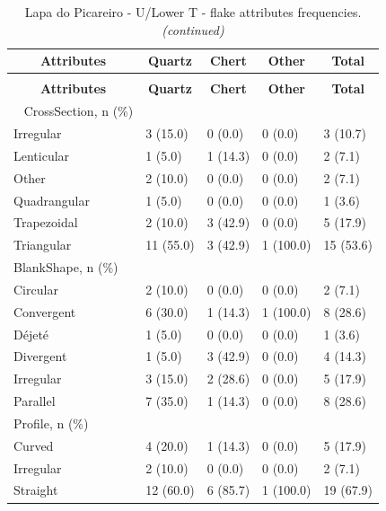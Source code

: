 \documentclass[12pt,twoside]{reedthesis}
\begin{document}
\begingroup\fontsize{9}{11}\selectfont
\begin{longtable}[t]{lllll}
\caption{\label{tab:flakeattributesLP1}Lapa do Picareiro - U/Lower T - flake attributes frequencies.}\\
\toprule
\multicolumn{1}{c}{\textbf{Attributes}} & \multicolumn{1}{c}{\textbf{Quartz}} & \multicolumn{1}{c}{\textbf{Chert}} & \multicolumn{1}{c}{\textbf{Other}} & \multicolumn{1}{c}{\textbf{Total}}\\
\midrule
\endfirsthead
\caption[]{\label{tab:flakeattributesLP1}Lapa do Picareiro - U/Lower T - flake attributes frequencies. \textit{(continued)}}\\
\toprule
\multicolumn{1}{c}{\textbf{Attributes}} & \multicolumn{1}{c}{\textbf{Quartz}} & \multicolumn{1}{c}{\textbf{Chert}} & \multicolumn{1}{c}{\textbf{Other}} & \multicolumn{1}{c}{\textbf{Total}}\\
\midrule
\endhead
\
\endfoot
\bottomrule
\endlastfoot
CrossSection, n (\%) &  &  &  & \\
Irregular & 3 (15.0) & 0 (0.0) & 0 (0.0) & 3 (10.7)\\
Lenticular & 1 (5.0) & 1 (14.3) & 0 (0.0) & 2 (7.1)\\
Other & 2 (10.0) & 0 (0.0) & 0 (0.0) & 2 (7.1)\\
Quadrangular & 1 (5.0) & 0 (0.0) & 0 (0.0) & 1 (3.6)\\
\addlinespace
Trapezoidal & 2 (10.0) & 3 (42.9) & 0 (0.0) & 5 (17.9)\\
Triangular & 11 (55.0) & 3 (42.9) & 1 (100.0) & 15 (53.6)\\
BlankShape, n (\%) &  &  &  & \\
Circular & 2 (10.0) & 0 (0.0) & 0 (0.0) & 2 (7.1)\\
Convergent & 6 (30.0) & 1 (14.3) & 1 (100.0) & 8 (28.6)\\
\addlinespace
Déjeté & 1 (5.0) & 0 (0.0) & 0 (0.0) & 1 (3.6)\\
Divergent & 1 (5.0) & 3 (42.9) & 0 (0.0) & 4 (14.3)\\
Irregular & 3 (15.0) & 2 (28.6) & 0 (0.0) & 5 (17.9)\\
Parallel & 7 (35.0) & 1 (14.3) & 0 (0.0) & 8 (28.6)\\
Profile, n (\%) &  &  &  & \\
\addlinespace
Curved & 4 (20.0) & 1 (14.3) & 0 (0.0) & 5 (17.9)\\
Irregular & 2 (10.0) & 0 (0.0) & 0 (0.0) & 2 (7.1)\\
Straight & 12 (60.0) & 6 (85.7) & 1 (100.0) & 19 (67.9)\\

\end{longtable}
\end{document}
